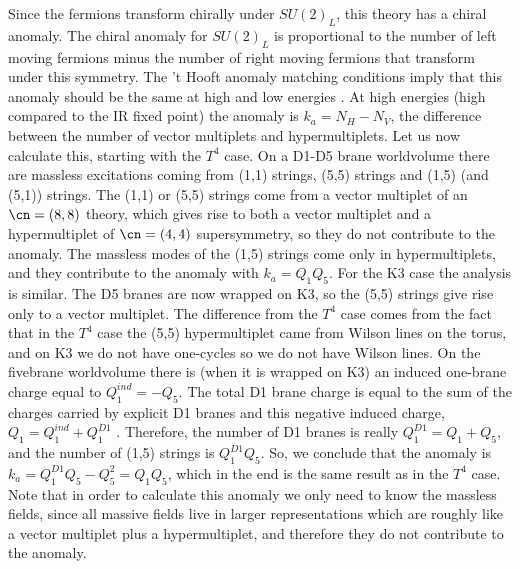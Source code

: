 Since the fermions transform chirally under $SU(2)_L$, this theory 
has  a chiral anomaly. The chiral anomaly for 
$SU(2)_L$ is proportional to the number of left moving fermions 
minus the number of right moving fermions that transform under this 
symmetry. The 't Hooft anomaly matching conditions imply that 
this anomaly should be the same at high and low energies
\cite{'tHooft:1980xb}.
At high energies (high compared to the IR fixed point) 
 the anomaly is  $k_a = N_H - N_V$, the difference 
between the number of vector multiplets and hypermultiplets. 
Let us now calculate this, starting with the $T^4$ case. 
On a D1-D5 brane worldvolume there are massless excitations coming from 
(1,1) strings, (5,5) strings and (1,5) (and (5,1)) strings. 
The (1,1) or (5,5) strings come from a vector multiplet of an
 $\cn=(8,8)$ theory,
which gives rise to both a vector multiplet and a hypermultiplet of
 $\cn=(4,4)$ supersymmetry, so they do not contribute to the
anomaly.
 The massless modes of the (1,5) strings 
come only in hypermultiplets, and they contribute to the 
anomaly with $k_a = Q_1 Q_5$. 
For the K3 case the analysis is similar. The D5 branes are 
now wrapped on K3, so the (5,5) strings give rise only to a vector
multiplet. The difference from the $T^4$ case comes from the fact
that in the $T^4$ case the (5,5) hypermultiplet came from Wilson lines on
the torus, and on K3 we do not have one-cycles so we do not have
Wilson lines. On the fivebrane worldvolume there is (when it is
 wrapped on K3) an induced
one-brane charge equal to $Q_1^{ind} = - Q_5 $. The total D1 brane
charge is equal to the sum of the charges carried by 
explicit D1 branes and this negative induced charge,
$Q_1 = Q_1^{ind} + Q_1^{D1}$ \cite{Bershadsky:1996qy}.
Therefore, the number of D1 branes
is really $Q_1^{D1} = Q_1 + Q_5$, and the number of (1,5) strings
is $Q_1^{D1} Q_5 $. So, we conclude that the anomaly is
$k_a = Q_1^{D1} Q_5  - Q_5^2 = Q_1 Q_5 $, which in the end is the same
result as in the $T^4$ case.
Note that in order to calculate this anomaly we only need to know
the massless fields, since all massive fields live in larger
representations which are roughly like a vector multiplet plus a
 hypermultiplet, and
therefore they do not contribute to the anomaly.  

